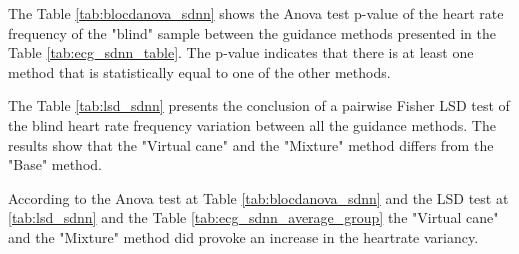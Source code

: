 The Table \ref{tab:blocdanova_sdnn} shows the Anova test p-value of the heart rate frequency of the "blind" sample between the guidance methods presented in the Table \ref{tab:ecg_sdnn_table}. The p-value indicates that there is at least one method that is statistically equal to one of the other methods.



The Table \ref{tab:lsd_sdnn} presents the conclusion of a pairwise Fisher LSD test of the blind heart rate frequency variation between all the guidance methods. The results show that the "Virtual cane" and the "Mixture" method differs from the "Base" method.



According to the Anova test at Table \ref{tab:blocdanova_sdnn} and the LSD test at \ref{tab:lsd_sdnn} and the Table \ref{tab:ecg_sdnn_average_group} the "Virtual cane" and the "Mixture" method did provoke an increase in the heartrate variancy.

\FloatBarrier